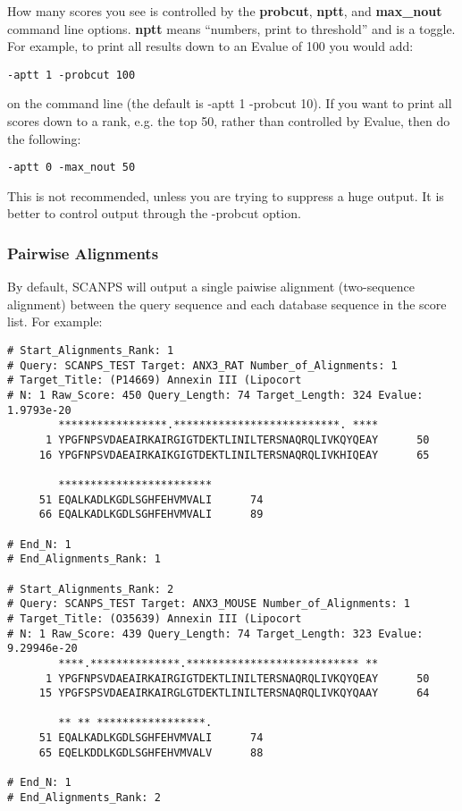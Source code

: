 \documentclass[12pt]{article}
\begin{document}
How many scores you see is controlled by the {\bf probcut}, {\bf
nptt}, and {\bf max\_nout} command line options.  {\bf nptt} means
``numbers, print to threshold'' and is a toggle.  For example, to
print all results down to an Evalue of 100 you would add:

\begin{verbatim}
-aptt 1 -probcut 100
\end{verbatim}

on the command line (the default is -aptt 1 -probcut 10).  If you want
to print all scores down to a rank, e.g. the top 50,  rather than controlled by Evalue,
then do the following:

\begin{verbatim}
-aptt 0 -max_nout 50
\end{verbatim}

This is not recommended, unless you are trying to suppress a huge
output.  It is better to control output through the -probcut option.

\subsubsection{Pairwise Alignments}

By default, SCANPS will output a single paiwise alignment
(two-sequence alignment) between the query sequence and each database
sequence in the score list.  For example:

\begin{scriptsize}
\begin{verbatim}
# Start_Alignments_Rank: 1
# Query: SCANPS_TEST Target: ANX3_RAT Number_of_Alignments: 1
# Target_Title: (P14669) Annexin III (Lipocort
# N: 1 Raw_Score: 450 Query_Length: 74 Target_Length: 324 Evalue: 1.9793e-20
        *****************.**************************. ****
      1 YPGFNPSVDAEAIRKAIRGIGTDEKTLINILTERSNAQRQLIVKQYQEAY      50
     16 YPGFNPSVDAEAIRKAIKGIGTDEKTLINILTERSNAQRQLIVKHIQEAY      65

        ************************
     51 EQALKADLKGDLSGHFEHVMVALI      74
     66 EQALKADLKGDLSGHFEHVMVALI      89

# End_N: 1
# End_Alignments_Rank: 1

# Start_Alignments_Rank: 2
# Query: SCANPS_TEST Target: ANX3_MOUSE Number_of_Alignments: 1
# Target_Title: (O35639) Annexin III (Lipocort
# N: 1 Raw_Score: 439 Query_Length: 74 Target_Length: 323 Evalue: 9.29946e-20
        ****.**************.*************************** **
      1 YPGFNPSVDAEAIRKAIRGIGTDEKTLINILTERSNAQRQLIVKQYQEAY      50
     15 YPGFSPSVDAEAIRKAIRGLGTDEKTLINILTERSNAQRQLIVKQYQAAY      64

        ** ** *****************.
     51 EQALKADLKGDLSGHFEHVMVALI      74
     65 EQELKDDLKGDLSGHFEHVMVALV      88

# End_N: 1
# End_Alignments_Rank: 2
\end{verbatim}
\end{scriptsize}
\end{document}

